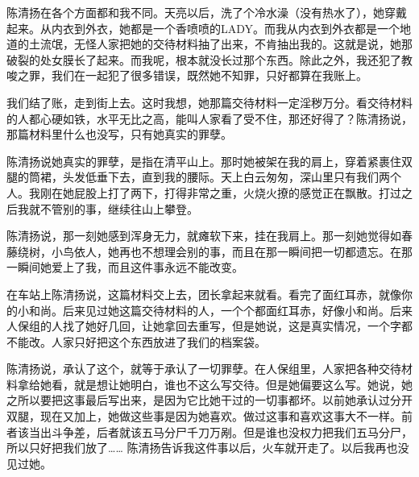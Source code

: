 陈清扬在各个方面都和我不同。天亮以后，洗了个冷水澡（没有热水了），她穿戴起来。从内衣到外衣，她都是一个香喷喷的LADY。而我从内衣到外衣都是一个地道的土流氓，无怪人家把她的交待材料抽了出来，不肯抽出我的。这就是说，她那破裂的处女膜长了起来。而我呢，根本就没长过那个东西。除此之外，我还犯了教唆之罪，我们在一起犯了很多错误，既然她不知罪，只好都算在我账上。 
 
我们结了账，走到街上去。这时我想，她那篇交待材料一定淫秽万分。看交待材料的人都心硬如铁，水平无比之高，能叫人家看了受不住，那还好得了？陈清扬说，那篇材料里什么也没写，只有她真实的罪孽。 
 
陈清扬说她真实的罪孽，是指在清平山上。那时她被架在我的肩上，穿着紧裹住双腿的筒裙，头发低垂下去，直到我的腰际。天上白云匆匆，深山里只有我们两个人。我刚在她屁股上打了两下，打得非常之重，火烧火撩的感觉正在飘散。打过之后我就不管别的事，继续往山上攀登。 
 
陈清扬说，那一刻她感到浑身无力，就瘫软下来，挂在我肩上。那一刻她觉得如春藤绕树，小鸟依人，她再也不想理会别的事，而且在那一瞬间把一切都遗忘。在那一瞬间她爱上了我，而且这件事永远不能改变。 
 
在车站上陈清扬说，这篇材料交上去，团长拿起来就看。看完了面红耳赤，就像你的小和尚。后来见过她这篇交待材料的人，一个个都面红耳赤，好像小和尚。后来人保组的人找了她好几回，让她拿回去重写，但是她说，这是真实情况，一个字都不能改。人家只好把这个东西放进了我们的档案袋。 
 
陈清扬说，承认了这个，就等于承认了一切罪孽。在人保组里，人家把各种交待材料拿给她看，就是想让她明白，谁也不这么写交待。但是她偏要这么写。她说，她之所以要把这事最后写出来，是因为它比她干过的一切事都坏。以前她承认过分开双腿，现在又加上，她做这些事是因为她喜欢。做过这事和喜欢这事大不一样。前者该当出斗争差，后者就该五马分尸千刀万剐。但是谁也没权力把我们五马分尸，所以只好把我们放了…… 陈清扬告诉我这件事以后，火车就开走了。以后我再也没见过她。



